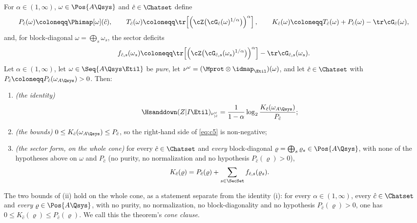 \begin{theorem}\label{thm:branch-formula}
For $\alpha\in(1,\infty)$, $\omega\in\Pos{A\Qsys}$ and $\hat c\in\Chatset$
define
\begin{equation}\label{eq:fK}
  P_{\hat c}(\omega)\coloneqq\Phimap[\omega](\hat c),\qquad
  T_{\hat c}(\omega)\coloneqq
  \tr\!\left[\left(\cZ\big(\cG_{\hat c}(\omega)^{1/\alpha}\big)
  \right)^{\alpha}\right],\qquad
  K_{\hat c}(\omega)\coloneqq
  T_{\hat c}(\omega)+P_{\hat c}(\omega)-\tr\cG_{\hat c}(\omega),
\end{equation}
and, for block-diagonal $\omega=\bigoplus_s\omega_s$, the sector deficits
\begin{equation}\label{eq:f-def}
  f_{\hat c,s}(\omega_s)\coloneqq
  \tr\!\left[\left(\cZ\big(\cG_{\hat c,s}(\omega_s)^{1/\alpha}\big)
  \right)^{\alpha}\right]-\tr\cG_{\hat c,s}(\omega_s).
\end{equation}
Let $\alpha\in(1,\infty)$, let $\omega\in\Seq{A\Qsys\Etil}$ be \emph{pure},
let $\nu^{\omega}=(\Mprot\otimes\idmap_{\Etil})(\omega)$, and let
$\hat c\in\Chatset$ with $P_{\hat c}\coloneqq
P_{\hat c}(\omega_{A\Qsys})>0$. Then:
\begin{enumerate}[label=(\roman*),leftmargin=2.2em]
\item \emph{(the identity)}
\begin{equation}\label{eq:c5}
  \Hsanddown(Z|I\Etil)_{\nu^{\omega}_{|\hat c}}
  =\frac{1}{1-\alpha}\log_2\frac{K_{\hat c}(\omega_{A\Qsys})}{P_{\hat c}};
\end{equation}
\item \emph{(the bounds)} $0\le K_{\hat c}(\omega_{A\Qsys})\le P_{\hat c}$, so
the right-hand side of \eqref{eq:c5} is non-negative;
\item \emph{(the sector form, on the whole cone)} for every
$\hat c\in\Chatset$ and \emph{every} block-diagonal
$\varrho=\bigoplus_s\varrho_s\in\Pos{A\Qsys}$, with none of the hypotheses
above on $\omega$ and $P_{\hat c}$ (no purity, no normalization and no
hypothesis $P_{\hat c}(\varrho)>0$),
\begin{equation}\label{eq:c5-sector}
  K_{\hat c}(\varrho)
  =P_{\hat c}(\varrho)+\sum_{s\in\SecSet}f_{\hat c,s}(\varrho_s).
\end{equation}
\end{enumerate}
The two bounds of (ii) hold on the whole cone, as a statement separate from
the identity (i): for every $\alpha\in(1,\infty)$, every
$\hat c\in\Chatset$ and \emph{every} $\varrho\in\Pos{A\Qsys}$, with no
purity, no normalization, no block-diagonality and no hypothesis
$P_{\hat c}(\varrho)>0$, one has $0\le K_{\hat c}(\varrho)\le
P_{\hat c}(\varrho)$. We call this the theorem's \emph{cone clause}.
\end{theorem}

